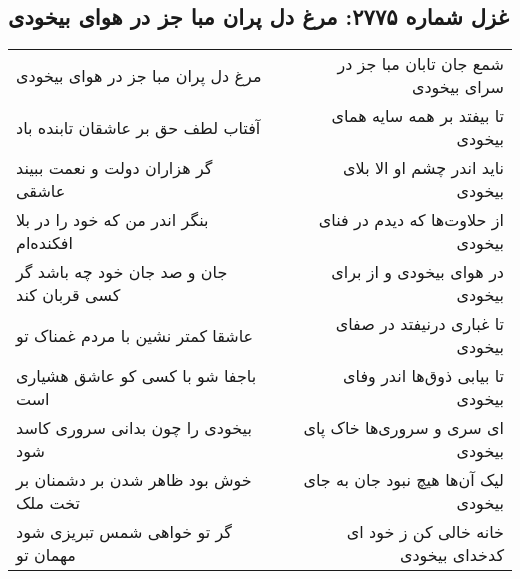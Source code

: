 \begin{center}
\section*{غزل شماره ۲۷۷۵: مرغ دل پران مبا جز در هوای بیخودی}
\label{sec:2775}
\begin{longtable}{l p{0.5cm} r}
مرغ دل پران مبا جز در هوای بیخودی
&&
شمع جان تابان مبا جز در سرای بیخودی
\\
آفتاب لطف حق بر عاشقان تابنده باد
&&
تا بیفتد بر همه سایه همای بیخودی
\\
گر هزاران دولت و نعمت ببیند عاشقی
&&
ناید اندر چشم او الا بلای بیخودی
\\
بنگر اندر من که خود را در بلا افکنده‌ام
&&
از حلاوت‌ها که دیدم در فنای بیخودی
\\
جان و صد جان خود چه باشد گر کسی قربان کند
&&
در هوای بیخودی و از برای بیخودی
\\
عاشقا کمتر نشین با مردم غمناک تو
&&
تا غباری درنیفتد در صفای بیخودی
\\
باجفا شو با کسی کو عاشق هشیاری است
&&
تا بیابی ذوق‌ها اندر وفای بیخودی
\\
بیخودی را چون بدانی سروری کاسد شود
&&
ای سری و سروری‌ها خاک پای بیخودی
\\
خوش بود ظاهر شدن بر دشمنان بر تخت ملک
&&
لیک آن‌ها هیچ نبود جان به جای بیخودی
\\
گر تو خواهی شمس تبریزی شود مهمان تو
&&
خانه خالی کن ز خود ای کدخدای بیخودی
\\
\end{longtable}
\end{center}
